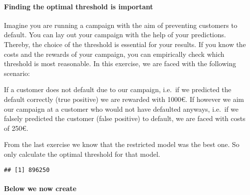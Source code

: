 \documentclass[
]{article}
\newenvironment{Shaded}{\begin{snugshade}}{\end{snugshade}}
\newcommand{\CommentTok}[1]{\textcolor[rgb]{0.56,0.35,0.01}{\textit{#1}}}
\newcommand{\DecValTok}[1]{\textcolor[rgb]{0.00,0.00,0.81}{#1}}
\newcommand{\FloatTok}[1]{\textcolor[rgb]{0.00,0.00,0.81}{#1}}
\newcommand{\KeywordTok}[1]{\textcolor[rgb]{0.13,0.29,0.53}{\textbf{#1}}}
\newcommand{\NormalTok}[1]{#1}
\newcommand{\OperatorTok}[1]{\textcolor[rgb]{0.81,0.36,0.00}{\textbf{#1}}}
\newcommand{\StringTok}[1]{\textcolor[rgb]{0.31,0.60,0.02}{#1}}
\begin{document}
\hypertarget{finding-the-optimal-threshold-is-important}{%
\paragraph{Finding the optimal threshold is
important}\label{finding-the-optimal-threshold-is-important}}

Imagine you are running a campaign with the aim of preventing customers
to default. You can lay out your campaign with the help of your
predictions. Thereby, the choice of the threshold is essential for your
results. If you know the costs and the rewards of your campaign, you can
empirically check which threshold is most reasonable. In this exercise,
we are faced with the following scenario:

If a customer does not default due to our campaign, i.e.~if we predicted
the default correctly (true positive) we are rewarded with 1000€. If
however we aim our campaign at a customer who would not have defaulted
anyways, i.e.~if we falsely predicted the customer (false positive) to
default, we are faced with costs of 250€.

From the last exercise we know that the restricted model was the best
one. So only calculate the optimal threshold for that model.

\begin{Shaded}
\end{Shaded}

\begin{verbatim}
## [1] 896250
\end{verbatim}

\hypertarget{below-we-now-create}{%
\paragraph{Below we now create}\label{below-we-now-create}}
\end{document}
